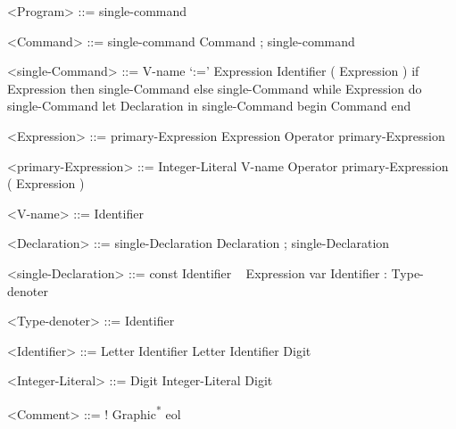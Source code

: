 \begin{grammar}




<Program> ::= single-command

<Command> ::= single-command
\alt Command ; single-command

<single-Command> ::= V-name `:=' Expression
\alt Identifier ( Expression )
\alt if Expression
\alt then single-Command
\alt else single-Command
\alt while Expression do single-Command
\alt let Declaration in single-Command
\alt begin Command end

<Expression> ::= primary-Expression
\alt Expression Operator primary-Expression

<primary-Expression> ::= Integer-Literal
\alt V-name
\alt Operator primary-Expression
\alt ( Expression )

<V-name> ::= Identifier

<Declaration> ::= single-Declaration
\alt Declaration ; single-Declaration

<single-Declaration> ::= const Identifier ~ Expression
\alt var Identifier : Type-denoter

<Type-denoter> ::= Identifier

<Identifier> ::= Letter
\alt Identifier Letter
\alt Identifier Digit

<Integer-Literal> ::= Digit
\alt Integer-Literal Digit

<Comment> ::= ! Graphic\textsuperscript{*} eol

\end{grammar}

